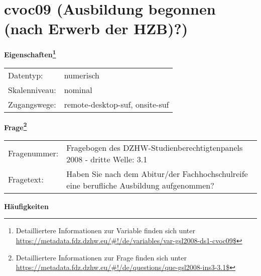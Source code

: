 
    \setcounter{footnote}{0}

    \vspace*{-1.8cm}
	\section{cvoc09 (Ausbildung begonnen (nach Erwerb der HZB)?)}
	\label{section:cvoc09}



    \vspace*{0.5cm}
    \noindent\textbf{Eigenschaften\footnote{Detailliertere Informationen zur Variable finden sich unter
		\url{https://metadata.fdz.dzhw.eu/\#!/de/variables/var-gsl2008-ds1-cvoc09$}}}\\
	\begin{tabularx}{\hsize}{@{}lX}
	Datentyp: & numerisch \\
	Skalenniveau: & nominal \\
	Zugangswege: &
	  remote-desktop-suf, 
	  onsite-suf
 \\
    \end{tabularx}



				\vspace*{0.5cm}
                \noindent\textbf{Frage\footnote{Detailliertere Informationen zur Frage finden sich unter
		              \url{https://metadata.fdz.dzhw.eu/\#!/de/questions/que-gsl2008-ins3-3.1$}}}\\
				\begin{tabularx}{\hsize}{@{}lX}
					Fragenummer: &
					  Fragebogen des DZHW-Studienberechtigtenpanels 2008 - dritte Welle:
					  3.1
 \\
					Fragetext: & Haben Sie nach dem Abitur/der Fachhochschulreife eine berufliche Ausbildung aufgenommen? \\
				\end{tabularx}





        		\vspace*{0.5cm}
                \noindent\textbf{Häufigkeiten}

